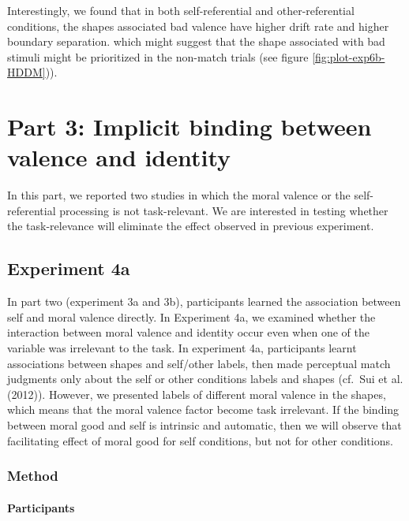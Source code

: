 \documentclass[
  english,
  man]{apa6}
\let\oldparagraph\paragraph
\renewcommand{\paragraph}[1]{\oldparagraph{#1}\mbox{}}
\begin{document}
Interestingly, we found that in both self-referential and other-referential conditions, the shapes associated bad valence have higher drift rate and higher boundary separation. which might suggest that the shape associated with bad stimuli might be prioritized in the non-match trials (see figure \ref{fig:plot-exp6b-HDDM})).

\hypertarget{part-3-implicit-binding-between-valence-and-identity}{%
\section{Part 3: Implicit binding between valence and identity}\label{part-3-implicit-binding-between-valence-and-identity}}

In this part, we reported two studies in which the moral valence or the self-referential processing is not task-relevant. We are interested in testing whether the task-relevance will eliminate the effect observed in previous experiment.

\hypertarget{experiment-4a}{%
\subsection{Experiment 4a}\label{experiment-4a}}

In part two (experiment 3a and 3b), participants learned the association between self and moral valence directly. In Experiment 4a, we examined whether the interaction between moral valence and identity occur even when one of the variable was irrelevant to the task. In experiment 4a, participants learnt associations between shapes and self/other labels, then made perceptual match judgments only about the self or other conditions labels and shapes (cf.~Sui et al. (2012)). However, we presented labels of different moral valence in the shapes, which means that the moral valence factor become task irrelevant. If the binding between moral good and self is intrinsic and automatic, then we will observe that facilitating effect of moral good for self conditions, but not for other conditions.

\hypertarget{method-6}{%
\subsubsection{Method}\label{method-6}}

\hypertarget{participants-8}{%
\paragraph{Participants}\label{participants-8}}
\end{document}
